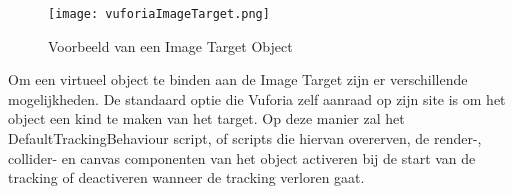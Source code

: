 \begin{figure}
    \texttt{[image: vuforiaImageTarget.png]}
    \caption{Voorbeeld van een Image Target Object}
    \label{fig:vuforiaImageTarget}
\end{figure}

Om een virtueel object te binden aan de Image Target zijn er verschillende mogelijkheden. De standaard optie die Vuforia zelf aanraad op zijn site is om het object een kind te maken van het target. Op deze manier zal het DefaultTrackingBehaviour script, of scripts die hiervan overerven, de render-, collider- en canvas componenten van het object activeren bij de start van de tracking of deactiveren wanneer de tracking verloren gaat.


